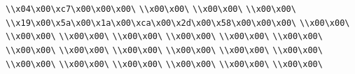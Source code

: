 \verb|\\x04\x00\xc7\x00\x00\x00\|\newline
\verb|\\x00\x00\|\newline
\verb|\\x00\x00\|\newline
\verb|\\x00\x00\|\newline
\verb|\\x19\x00\x5a\x00\x1a\x00\xca\x00\x2d\x00\x58\x00\x00\x00\|\newline
\verb|\\x00\x00\|\newline
\verb|\\x00\x00\|\newline
\verb|\\x00\x00\|\newline
\verb|\\x00\x00\|\newline
\verb|\\x00\x00\|\newline
\verb|\\x00\x00\|\newline
\verb|\\x00\x00\|\newline
\verb|\\x00\x00\|\newline
\verb|\\x00\x00\|\newline
\verb|\\x00\x00\|\newline
\verb|\\x00\x00\|\newline
\verb|\\x00\x00\|\newline
\verb|\\x00\x00\|\newline
\verb|\\x00\x00\|\newline
\verb|\\x00\x00\|\newline
\verb|\\x00\x00\|\newline
\verb|\\x00\x00\|\newline
\verb|\\x00\x00\|\newline
\verb|\\x00\x00\|\newline

